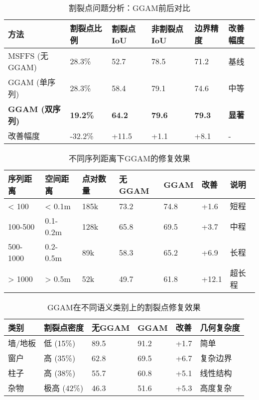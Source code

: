 \documentclass[preprint,12pt]{elsarticle}
\begin{document}
\begin{table}[htbp!]
	\centering
	\caption{割裂点问题分析：GGAM前后对比}
	\label{tab:split_point_analysis}
	\begin{tabular}{@{}llllll@{}}
		\toprule
		方法 & 割裂点比例 & 割裂点IoU & 非割裂点IoU & 边界精度 & 改善幅度 \\ 
		\midrule
		MSFFS (无GGAM) & 28.3\% & 52.7 & 78.5 & 71.2 & 基线 \\
		GGAM (单序列) & 28.3\% & 58.4 & 79.1 & 74.6 & 中等 \\
		\textbf{GGAM (双序列)} & \textbf{19.2\%} & \textbf{64.2} & \textbf{79.6} & \textbf{79.3} & \textbf{显著} \\
		\midrule
		改善幅度 & -32.2\% & +11.5 & +1.1 & +8.1 & - \\
		\bottomrule
	\end{tabular}
\end{table}

\begin{table}[htbp!]
	\centering
	\caption{不同序列距离下GGAM的修复效果}
	\label{tab:split_distance_analysis}
	\begin{tabular}{@{}lllllll@{}}
		\toprule
		序列距离 & 空间距离 & 点对数量 & 无GGAM & GGAM & 改善 & 说明 \\ 
		\midrule
		< 100 & < 0.1m & 185k & 73.2 & 74.8 & +1.6 & 短程 \\
		100-500 & 0.1-0.2m & 128k & 65.8 & 69.5 & +3.7 & 中程 \\
		500-1000 & 0.2-0.5m & 89k & 58.3 & 65.2 & +6.9 & 长程 \\
		> 1000 & > 0.5m & 52k & 49.7 & 61.8 & +12.1 & 超长程 \\
		\bottomrule
	\end{tabular}
\end{table}

\begin{table}[htbp!]
	\centering
	\caption{GGAM在不同语义类别上的割裂点修复效果}
	\label{tab:split_point_per_class}
	\begin{tabular}{@{}llllll@{}}
		\toprule
		类别 & 割裂点密度 & 无GGAM & GGAM & 改善 & 几何复杂度 \\ 
		\midrule
		墙/地板 & 低 (15\%) & 89.5 & 91.2 & +1.7 & 简单 \\
		窗户 & 高 (35\%) & 62.8 & 69.5 & +6.7 & 复杂边界 \\
		柱子 & 高 (38\%) & 55.7 & 60.8 & +5.1 & 线性结构 \\
		杂物 & 极高 (42\%) & 46.3 & 51.6 & +5.3 & 高度复杂 \\
		\bottomrule
	\end{tabular}
\end{table}
\end{document}
